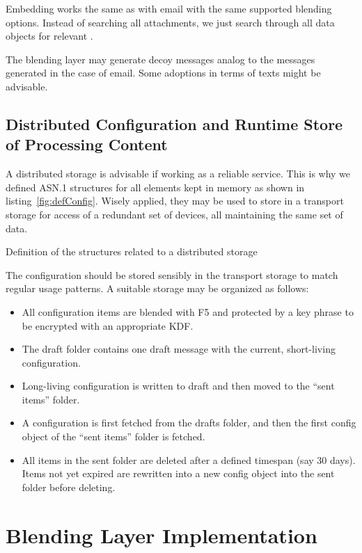 Embedding works the same as with email with the same supported blending options. Instead of searching all attachments, we just search through all data objects for relevant \VortexMessages.

The blending layer may generate decoy messages analog to the messages generated in the case of email. Some adoptions in terms of texts might be advisable.

\section{Distributed Configuration and Runtime Store of Processing Content}
A distributed storage is advisable if working as a reliable service. This is why we defined ASN.1 structures for all elements kept in memory as shown in listing~\ref{fig:defConfig}. Wisely applied, they may be used to store in a transport storage for access of a redundant set of devices, all maintaining the same set of data. 

\begin{lstfloat}[ht]
	
	\caption{Definition of the structures related to a distributed storage}
	\label{fig:defConfig}
\end{lstfloat}

The configuration should be stored sensibly in the transport storage to match regular usage patterns. A suitable storage may be organized as follows:
\begin{itemize}
	\item All configuration items are blended with F5 and protected by a key phrase to be encrypted with an appropriate KDF.
	\item The draft folder contains one draft message with the current, short-living configuration. 
	\item Long-living configuration is written to draft and then moved to the ``sent items'' folder.
	\item A configuration is first fetched from the drafts folder, and then the first config object of the ``sent items'' folder is fetched.
	\item All items in the sent folder are deleted after a defined timespan (say 30 days). Items not yet expired are rewritten into a new config object into the sent folder before deleting. 
\end{itemize}


\chapter{Blending Layer Implementation}\label{sec:blendingImplementation}
